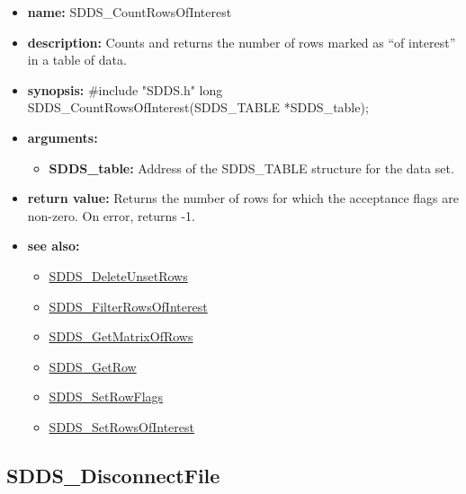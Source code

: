 \documentclass[11pt]{article}
\newcommand{\progref}[1]{\hyperref{SDDS_#1}{{\tt SDDS\_#1} (}{)}{SDDS_#1}}
\begin{document}
\begin{itemize}
\item {\bf name:}\newline
SDDS\_CountRowsOfInterest
\item {\bf description:}\newline
Counts and returns the number of rows marked as ``of interest'' in a table of data.
\item {\bf synopsis:} \#include "SDDS.h"\newline
long SDDS\_CountRowsOfInterest(SDDS\_TABLE *SDDS\_table);
\item {\bf arguments:}
\begin{itemize}
\item {\bf SDDS\_table:} Address of the SDDS\_TABLE structure for the data set.
\end{itemize}
\item {\bf return value:}\newline
Returns the number of rows for which the acceptance flags are non-zero. On error, returns -1.
\item {\bf see also:}
\begin{itemize}
\item \progref{DeleteUnsetRows}
\item \progref{FilterRowsOfInterest}
\item \progref{GetMatrixOfRows}
\item \progref{GetRow}
\item \progref{SetRowFlags}
\item \progref{SetRowsOfInterest}
\end{itemize}
\end{itemize}

\subsection{SDDS\_DisconnectFile}
\label{SDDS_DisconnectFile}
\end{document}
